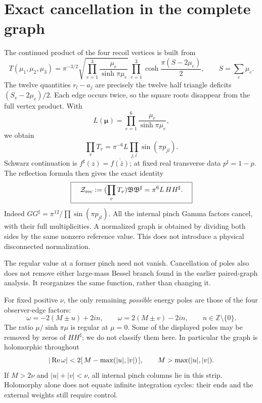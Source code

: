 \documentclass[11pt,a4paper]{article}
\newcommand{\B}{\mathfrak B}
\begin{document}
\section{Exact cancellation in the complete graph}
The continued product of the four recoil vertices is built from
\begin{equation}
T(\mu_1,\mu_2,\mu_3)=
\pi^{-3/2}\sqrt{\prod_{e=1}^3\frac{\mu_e}{\sinh\pi\mu_e}}\,
\prod_{e=1}^3\cosh\frac{\pi(S-2\mu_e)}2,\qquad S=\sum_e\mu_e.
\end{equation}
The twelve quantities \(r_l-a_j\) are precisely the twelve
half triangle deficits \((S_v-2\mu_e)/2\).
Each edge occurs twice, so the square roots disappear from the
full vertex product. With
\begin{equation}
L(\boldsymbol\mu)=\prod_{e=1}^6\frac{\mu_e}{\sinh\pi\mu_e},
\end{equation}
we obtain
\begin{equation}
\prod_v T_v=\pi^{-6}L\prod_{j,l}\sin(\pi p_{jl}).
\label{eq:vertex}
\end{equation}
Schwarz continuation is \(f^\sharp(z)=\overline{f(\bar z)}\);
at fixed real transverse data \(p^\sharp=1-p\).
The reflection formula then gives the exact identity
\begin{equation}
\boxed{\quad
\mathcal Z_{\rm rec}:=(\prod_v T_v)\B\B^\sharp
=\pi^6 L\,H H^\sharp .
\quad}\label{eq:regulargraph}
\end{equation}
Indeed \(GG^\sharp=\pi^{12}/\prod\sin(\pi p_{jl})\).
All the internal pinch Gamma factors cancel, with their full
multiplicities. A normalized graph is obtained by dividing both
sides by the same nonzero reference value. This does not introduce
a physical disconnected normalization.

The regular value at a former pinch need not vanish.
Cancellation of poles also does not remove either large-mass
Bessel branch found in the earlier paired-graph analysis.
It reorganizes the same function, rather than changing it.

For fixed positive \(\nu\), the only remaining \emph{possible}
energy poles are those of the four observer-edge factors:
\begin{equation}
\omega=-2(M\pm u)+2in,\qquad
\omega=2(M\pm v)-2in,\qquad n\in\mathbb Z\setminus\{0\}.
\end{equation}
The ratio \(\mu/\sinh\pi\mu\) is regular at \(\mu=0\).
Some of the displayed poles may be removed by zeros of \(H H^\sharp\);
we do not classify them here.
In particular the graph is holomorphic throughout
\begin{equation}
|\mathop{\rm Re}\omega|<2[\,M-\max(|u|,|v|)\,],
\qquad M>\max(|u|,|v|).
\label{eq:strip}
\end{equation}
If \(M>2\nu\) and \(|u|+|v|<\nu\), all internal pinch columns
lie in this strip. Holomorphy alone does not equate infinite
integration cycles: their ends and the external weights still
require control.
\end{document}
